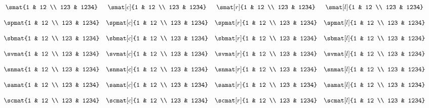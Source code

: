 \documentclass{standalone}
\begin{document}
\(\begin{array}{ccccc}
\\\\%
&	\smat{1 & 12 \\ 123 & 1234}
&	\smat[c]{1 & 12 \\ 123 & 1234}
&	\smat[r]{1 & 12 \\ 123 & 1234}
&	\smat[l]{1 & 12 \\ 123 & 1234}
\\\\%
&	\spmat{1 & 12 \\ 123 & 1234}
&	\spmat[c]{1 & 12 \\ 123 & 1234}
&	\spmat[r]{1 & 12 \\ 123 & 1234}
&	\spmat[l]{1 & 12 \\ 123 & 1234}
\\\\%
&	\sbmat{1 & 12 \\ 123 & 1234}
&	\sbmat[c]{1 & 12 \\ 123 & 1234}
&	\sbmat[r]{1 & 12 \\ 123 & 1234}
&	\sbmat[l]{1 & 12 \\ 123 & 1234}
\\\\%
&	\svmat{1 & 12 \\ 123 & 1234}
&	\svmat[c]{1 & 12 \\ 123 & 1234}
&	\svmat[r]{1 & 12 \\ 123 & 1234}
&	\svmat[l]{1 & 12 \\ 123 & 1234}
\\\\%
&	\snmat{1 & 12 \\ 123 & 1234}
&	\snmat[c]{1 & 12 \\ 123 & 1234}
&	\snmat[r]{1 & 12 \\ 123 & 1234}
&	\snmat[l]{1 & 12 \\ 123 & 1234}
\\\\%
&	\samat{1 & 12 \\ 123 & 1234}
&	\samat[c]{1 & 12 \\ 123 & 1234}
&	\samat[r]{1 & 12 \\ 123 & 1234}
&	\samat[l]{1 & 12 \\ 123 & 1234}
\\\\%
&	\scmat{1 & 12 \\ 123 & 1234}
&	\scmat[c]{1 & 12 \\ 123 & 1234}
&	\scmat[r]{1 & 12 \\ 123 & 1234}
&	\scmat[l]{1 & 12 \\ 123 & 1234}
\\\\%
\end{array}\)
\end{document}
